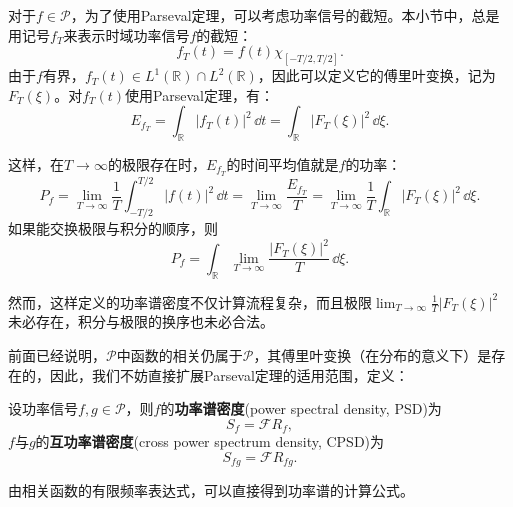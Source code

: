 对于$f\in \mathcal{P}$，为了使用Parseval定理，可以考虑功率信号的截短。本小节中，总是用记号$f_T$来表示时域功率信号$f$的截短：
\begin{equation}
    f_T(t)=f(t)\chi_{[-T/2,T/2]}.
\end{equation}
由于$f$有界，$f_T(t)\in L^1(\mathbb{R})\cap L^2(\mathbb{R})$，因此可以定义它的傅里叶变换，记为$F_T(\xi)$。对$f_T(t)$使用Parseval定理，有：
\begin{equation}
    E_{f_T}=\int_{\mathbb{R}}|f_T(t)|^2\,\dd t=\int_{\mathbb{R}}|F_T(\xi)|^2\,\dd\xi.
\end{equation}

这样，在$T\to\infty$的极限存在时，$E_{f_T}$的时间平均值就是$f$的功率：
\begin{equation}
    P_f=\lim_{T\to\infty}\frac{1}{T}\int_{-T/2}^{T/2}|f(t)|^2\,\dd t=\lim_{T\to\infty}\frac{E_{f_T}}{T}=\lim_{T\to\infty}\frac{1}{T}\int_{\mathbb{R}}|F_T(\xi)|^2\,\dd\xi.
\end{equation}
如果能交换极限与积分的顺序，则
\begin{equation}
    P_f=\int_{\mathbb{R}}\lim_{T\to\infty}\frac{|F_T(\xi)|^2}{T}\,\dd\xi.
\end{equation}

然而，这样定义的功率谱密度不仅计算流程复杂，而且极限$\displaystyle \lim_{T\to\infty}\frac{1}{T}|F_T(\xi)|^2$未必存在，积分与极限的换序也未必合法。

前面已经说明，$\mathcal{P}$中函数的相关仍属于$\mathcal{P}$，其傅里叶变换（在分布的意义下）是存在的，因此，我们不妨直接扩展Parseval定理的适用范围，定义：

\begin{definition}[功率谱密度]
    设功率信号$f,g\in\mathcal{P}$，则$f$的\textbf{功率谱密度}(power spectral density, PSD)为
    \begin{equation}
        S_f=\mathcal{F}R_f,
    \end{equation}
    $f$与$g$的\textbf{互功率谱密度}(cross power spectrum density, CPSD)为
    \begin{equation}
        S_{fg}=\mathcal{F}R_{fg}.
    \end{equation}
\end{definition}

由相关函数的有限频率表达式，可以直接得到功率谱的计算公式。

